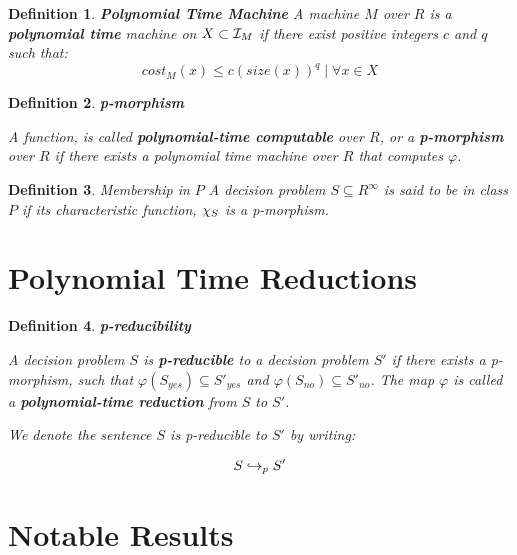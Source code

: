 \documentclass[twoside]{article}
\newtheorem{definition}{Definition}[section]
\begin{document}
\begin{definition}{\textbf{Polynomial Time Machine}}
  A machine $M$ over $R$ is a \textbf{polynomial time} machine on $X
  \subset \mathcal{I}_M$ if there exist positive integers $c$ and $q$
  such that:
  $$cost_M(x) \leq c(size(x))^q \mid \forall x \in X$$
\end{definition}

\begin{definition}{\textbf{p-morphism}}
  
  A function,  is called
  \textbf{polynomial-time computable} over $R$, or a
  \textbf{p-morphism} over $R$ if there exists a polynomial time
  machine over $R$ that computes $\varphi$.

\end{definition}

\begin{definition}{Membership in $P$}
  A decision problem $S \subseteq R^\infty$ is said to be in class $P$
  if its characteristic function, $\chi_S$ is a p-morphism.
\end{definition}
 
\section{Polynomial Time Reductions}

\begin{definition}{\textbf{p-reducibility}}

  A decision problem $S$ is \textbf{p-reducible} to a decision problem
  $S'$ if there exists a p-morphism,
   such that $\varphi(S_{yes})
  \subseteq S'_{yes}$ and $\varphi(S_{no}) \subseteq S'_{no}$.  The
  map $\varphi$ is called a \textbf{polynomial-time reduction} from
  $S$ to $S'$.

  We denote the sentence $S$ is p-reducible to $S'$ by writing:

  $$S \hookrightarrow_p S'$$
  \end{definition}


\section{Notable Results}
\end{document}
